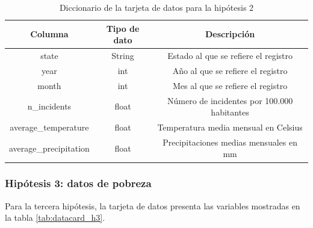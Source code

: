 \documentclass[11pt,a4paper]{article}
\begin{document}
\begin{table}[H]
    \centering
\begin{tabular}{|c|c|c|}
\hline
\textbf{Columna}       & \textbf{Tipo de dato} & \textbf{Descripción}                   \\ \hline
state                  & String                & Estado al que se refiere el registro   \\ \hline
year                   & int                   & Año al que se refiere el registro      \\ \hline
month                  & int                   & Mes al que se refiere el registro      \\ \hline
n\_incidents           & float                 & Número de incidentes por 100.000 habitantes   \\ \hline
average\_temperature   & float                 & Temperatura media mensual en Celsius   \\ \hline
average\_precipitation & float                 & Precipitaciones medias mensuales en mm \\ \hline
\end{tabular}
    \caption{Diccionario de la tarjeta de datos para la hipótesis 2}
    \label{tab:datacard_h2}
\end{table}

\subsubsection*{Hipótesis 3: datos de pobreza}

Para la tercera hipótesis, la tarjeta de datos presenta las variables mostradas en la tabla \ref{tab:datacard_h3}.
\end{document}
